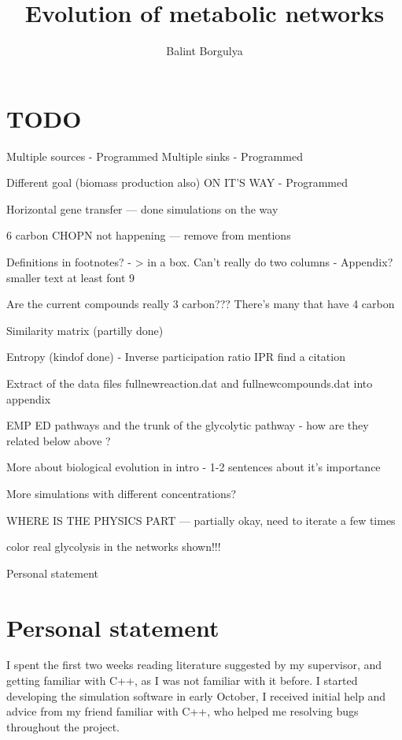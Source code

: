 \documentclass[10pt,a4paper]{article}
\title{Evolution of metabolic networks}
\author{Balint Borgulya}
\begin{document}
	
	
	
	\maketitle
	
	\begin{abstract}
		
	\end{abstract}
	
	\section*{TODO}
	\label{sec:todo}
	
	Multiple sources - Programmed
	Multiple sinks - Programmed

	Different goal (biomass production also) ON IT'S WAY - Programmed

	Horizontal gene transfer --- done simulations on the way

	6 carbon CHOPN not happening --- remove from mentions

	Definitions in footnotes? - > in a box. Can't really do two columns - Appendix? smaller text at least font 9

	Are the current compounds really 3 carbon??? There's many that have 4 carbon

	Similarity matrix (partilly done)

	Entropy (kindof done) - Inverse participation ratio  IPR find a citation

	Extract of the data files fullnewreaction.dat and fullnewcompounds.dat into appendix

	EMP ED pathways and the trunk of the glycolytic pathway - how are they related below above ?

	More about biological evolution in intro - 1-2 sentences about it's importance

	More simulations with different concentrations?

	WHERE IS THE PHYSICS PART --- partially okay, need to iterate a few times

	color real glycolysis in the networks shown!!!

	Personal statement

	\newpage
	\section*{Personal statement}
	I spent the first two weeks reading literature suggested by my supervisor, and getting familiar with C++, as I was not familiar with it before. 
	I started developing the simulation software in early October, I received initial help and advice from my friend familiar with C++, who helped me resolving bugs throughout the project. 
\end{document}
